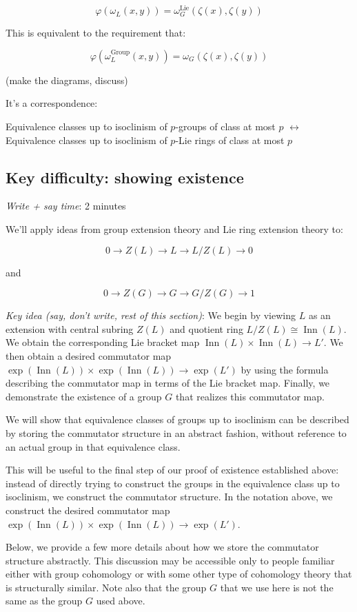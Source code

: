 \documentclass[10pt]{amsart}
\begin{document}
$$\varphi(\omega_L(x,y)) = \omega^{\text{Lie}}_G(\zeta(x),\zeta(y))$$

This is equivalent to the requirement that:

$$\varphi(\omega^{\text{Group}}_L(x,y)) = \omega_G(\zeta(x),\zeta(y))$$

(make the diagrams, discuss)

It's a correspondence:

Equivalence classes up to isoclinism of $p$-groups of class at most
$p$ $\leftrightarrow$ Equivalence classes up to isoclinism of $p$-Lie
rings of class at most $p$

\subsection{Key difficulty: showing existence}

{\em Write + say time}: 2 minutes

We'll apply ideas from group extension theory and Lie ring extension
theory to:

$$0 \to Z(L) \to L \to L/Z(L) \to 0$$

and

$$0 \to Z(G) \to G \to G/Z(G) \to 1$$

{\em Key idea (say, don't write, rest of this section)}: We begin by
viewing $L$ as an extension with central subring $Z(L)$ and quotient
ring $L/Z(L) \cong \operatorname{Inn}(L)$. We obtain the corresponding
Lie bracket map $\operatorname{Inn}(L) \times \operatorname{Inn}(L)
\to L'$. We then obtain a desired commutator map
$\exp(\operatorname{Inn}(L)) \times \exp(\operatorname{Inn}(L)) \to
\exp(L')$ by using the formula describing the commutator map in terms
of the Lie bracket map. Finally, we demonstrate the existence of a
group $G$ that realizes this commutator map.

We will show that equivalence classes of groups up to isoclinism can
be described by storing the commutator structure in an abstract
fashion, without reference to an actual group in that equivalence
class.

This will be useful to the final step of our proof of existence
established above: instead of directly trying to construct the groups
in the equivalence class up to isoclinism, we construct the commutator
structure. In the notation above, we construct the desired commutator
map $\exp(\operatorname{Inn}(L)) \times \exp(\operatorname{Inn}(L))
\to \exp(L')$.

Below, we provide a few more details about how we store the commutator
structure abstractly. This discussion may be accessible only to people
familiar either with group cohomology or with some other type of
cohomology theory that is structurally similar. Note also that the
group $G$ that we use here is not the same as the group $G$ used above.
\end{document}
